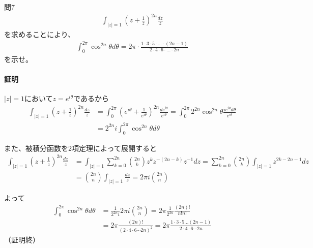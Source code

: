 \begin{mysimplebox}{問7}
   \begin{align*}
      \int_{|z|=1}\left(z+\frac{1}{z}\right)^{2n}\frac{dz}{z}
   \end{align*}
   を求めることにより、
   \begin{align*}
      \int_{0}^{2\pi}\cos^{2n}\theta d\theta
      =2\pi\cdot\frac{1\cdot3\cdot5\cdot\dots\cdot(2n-1)}{2\cdot4\cdot6\cdot\dots\cdot2n}
   \end{align*}
   を示せ。
\end{mysimplebox}
\paragraph{証明}
$|z|=1$において$z=e^{i\theta}$であるから
\begin{align*}
   \int_{|z|=1}\left(z+\frac{1}{z}\right)^{2n}\frac{dz}{z}
   &=\int_{0}^{2\pi}\left(e^{i\theta}+\frac{1}{e^{i\theta}}\right)^{2n}\frac{de^{i\theta}}{e^{i\theta}}
   =\int_{0}^{2\pi}2^{2n}\cos^{2n}\theta\frac{ie^{i\theta}d\theta}{e^{i\theta}}\\
   &=2^{2n}i\int_{0}^{2\pi}\cos^{2n}\theta d\theta
\end{align*}

また、被積分函数を2項定理によって展開すると
\begin{align*}
   \int_{|z|=1}\left(z+\frac{1}{z}\right)^{2n}\frac{dz}{z}
   &=\int_{|z|=1}\sum_{k=0}^{2n}\binom{2n}{k}z^kz^{-(2n-k)}z^{-1}dz
   =\sum_{k=0}^{2n}\binom{2n}{k}\int_{|z|=1}z^{2k-2n-1}dz\\
   &=\binom{2n}{n}\int_{|z|=1}\frac{dz}{z}=2\pi i\binom{2n}{n}
\end{align*}

よって
\begin{align*}
   \int_{0}^{2\pi}\cos^{2n}\theta d\theta
   &=\frac{1}{2^{2n}i}2\pi i\binom{2n}{n}
   =2\pi\frac{1}{2^{2n}}\frac{(2n)!}{n!n!}\\
   &=2\pi\frac{(2n)!}{(2\cdot4\cdot6\cdots2n)^2}
   =2\pi\frac{1\cdot3\cdot5\dots(2n-1)}{2\cdot4\cdot6\cdots2n}
\end{align*}
（証明終）